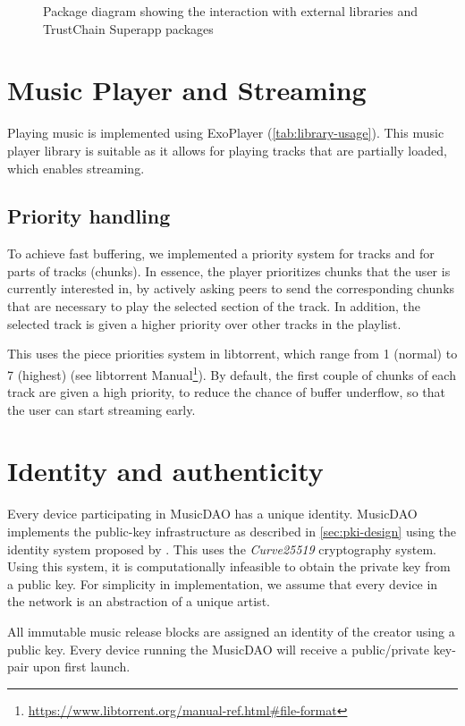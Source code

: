 \begin{figure}
        \caption{Package diagram showing the interaction with external libraries and TrustChain Superapp packages}
    \label{fig:package-diagram}
    \endminipage
\end{figure}

\section{Music Player and Streaming} 
Playing music is implemented using ExoPlayer (\ref{tab:library-usage}). This music player library is suitable as it allows for playing tracks that are partially loaded, which enables streaming.
\subsection{Priority handling}
To achieve fast buffering, we implemented a priority system for tracks and for parts of tracks (chunks). In essence, the player prioritizes chunks that the user is currently interested in, by actively asking peers to send the corresponding chunks that are necessary to play the selected section of the track. In addition, the selected track is given a higher priority over other tracks in the playlist.

This uses the piece priorities system in libtorrent, which range from 1 (normal) to 7 (highest) (see libtorrent Manual\footnote{\url{https://www.libtorrent.org/manual-ref.html\#file-format}}). By default, the first couple of chunks of each track are given a high priority, to reduce the chance of buffer underflow, so that the user can start streaming early.

\section{Identity and authenticity}
Every device participating in MusicDAO has a unique identity. MusicDAO implements the public-key infrastructure as described in \ref{sec:pki-design} using the identity system proposed by \cite{mattskala2020}. This uses the \textit{Curve25519} cryptography system. Using this system, it is computationally infeasible to obtain the private key from a  public key. For simplicity in implementation, we assume that every device in the network is an abstraction of a unique artist. 

All immutable music release blocks are assigned an identity of the creator using a public key. Every device running the MusicDAO will receive a public/private key-pair upon first launch. 

